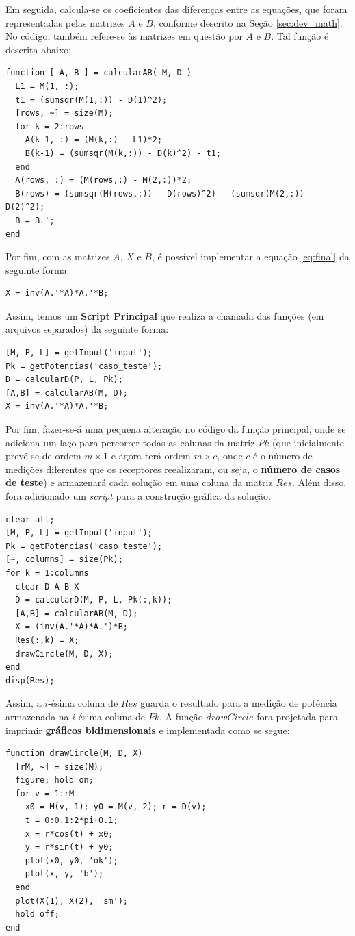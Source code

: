 	Em seguida, calcula-se os coeficientes das diferenças entre as equações, que foram representadas
	pelas matrizes $A$ e $B$, conforme descrito na Seção \ref{sec:dev_math}. No código, também refere-se às matrizes
	em questão por $A$ e $B$. Tal função é descrita abaixo:
	\begin{Verbatim}[fontsize=\footnotesize]
function [ A, B ] = calcularAB( M, D )
  L1 = M(1, :);
  t1 = (sumsqr(M(1,:)) - D(1)^2);
  [rows, ~] = size(M);
  for k = 2:rows
    A(k-1, :) = (M(k,:) - L1)*2;
    B(k-1) = (sumsqr(M(k,:)) - D(k)^2) - t1;
  end
  A(rows, :) = (M(rows,:) - M(2,:))*2;
  B(rows) = (sumsqr(M(rows,:)) - D(rows)^2) - (sumsqr(M(2,:)) - D(2)^2);
  B = B.';
end
	\end{Verbatim}

	Por fim, com as matrizes $A$, $X$ e $B$, é possível implementar a equação \ref{eq:final} da seguinte
	forma:
	\begin{Verbatim}[fontsize=\footnotesize]
X = inv(A.'*A)*A.'*B;
	\end{Verbatim}

	Assim, temos um \textbf{Script Principal} que realiza a chamada das funções (em arquivos separados) da seguinte
	forma:
	\begin{Verbatim}[fontsize=\footnotesize]
[M, P, L] = getInput('input');
Pk = getPotencias('caso_teste');
D = calcularD(P, L, Pk);
[A,B] = calcularAB(M, D);
X = inv(A.'*A)*A.'*B;
	\end{Verbatim}

	Por fim, fazer-se-á uma pequena alteração no código da função principal, onde se adiciona um laço para percorrer
	todas as colunas da matriz $Pk$ (que inicialmente prevê-se de ordem $m\times1$ e agora terá ordem $m\times c$, onde
	$c$ é o número de medições diferentes que os receptores reealizaram, ou seja, o \textbf{número de casos de teste}) e
	armazenará cada solução em uma coluna da matriz $Res$. Além disso, fora adicionado um \textit{script} para a construção
	gráfica da solução.
	\begin{Verbatim}[fontsize=\footnotesize]
clear all;
[M, P, L] = getInput('input');
Pk = getPotencias('caso_teste');
[~, columns] = size(Pk);
for k = 1:columns
  clear D A B X
  D = calcularD(M, P, L, Pk(:,k));
  [A,B] = calcularAB(M, D);
  X = (inv(A.'*A)*A.')*B;
  Res(:,k) = X;
  drawCircle(M, D, X);
end
disp(Res);
	\end{Verbatim}
	Assim, a $i$-ésima coluna de $Res$ guarda o resultado para a medição de potência armazenada na $i$-ésima coluna de $Pk$.
	A função $drawCircle$ fora projetada para imprimir \textbf{gráficos bidimensionais} e implementada como se segue:
	\begin{Verbatim}[fontsize=\footnotesize]
function drawCircle(M, D, X)
  [rM, ~] = size(M);
  figure; hold on;
  for v = 1:rM
    x0 = M(v, 1); y0 = M(v, 2); r = D(v);
    t = 0:0.1:2*pi+0.1;
    x = r*cos(t) + x0;
    y = r*sin(t) + y0;
    plot(x0, y0, 'ok');
    plot(x, y, 'b');
  end
  plot(X(1), X(2), 'sm');
  hold off;
end
	\end{Verbatim}

